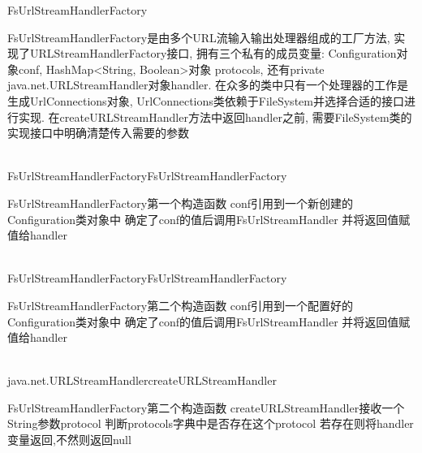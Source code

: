 \begin{XeClass}{FsUrlStreamHandlerFactory}
   
 FsUrlStreamHandlerFactory是由多个URL流输入输出处理器组成的工厂方法,
 实现了URLStreamHandlerFactory接口,
 拥有三个私有的成员变量: Configuration对象conf,
 HashMap<String, Boolean>对象 protocols,
 还有private java.net.URLStreamHandler对象handler.
 在众多的类中只有一个处理器的工作是生成UrlConnections对象,
 UrlConnections类依赖于FileSystem并选择合适的接口进行实现.
 在createURLStreamHandler方法中返回handler之前,
 需要FileSystem类的实现接口中明确清楚传入需要的参数

  \begin{XeMethod}{\XePublic\\ }{FsUrlStreamHandlerFactory}{FsUrlStreamHandlerFactory}
       
 FsUrlStreamHandlerFactory第一个构造函数
 conf引用到一个新创建的Configuration类对象中
 确定了conf的值后调用FsUrlStreamHandler
 并将返回值赋值给handler

  \end{XeMethod}

  \begin{XeMethod}{\XePublic\\ }{FsUrlStreamHandlerFactory}{FsUrlStreamHandlerFactory}
       
 FsUrlStreamHandlerFactory第二个构造函数
 conf引用到一个配置好的Configuration类对象中
 确定了conf的值后调用FsUrlStreamHandler
 并将返回值赋值给handler

  \end{XeMethod}

  \begin{XeMethod}{\XePublic\\ }{java.net.URLStreamHandler}{createURLStreamHandler}
       
 FsUrlStreamHandlerFactory第二个构造函数
 createURLStreamHandler接收一个String参数protocol
 判断protocols字典中是否存在这个protocol
 若存在则将handler变量返回,不然则返回null

  \end{XeMethod}

\end{XeClass}
